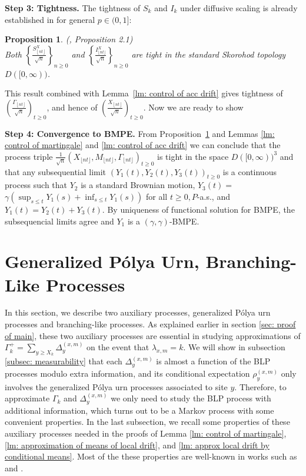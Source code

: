 \documentclass[twoside,12pt,a4paper]{article}
\newtheorem{proposition}{Proposition}[section]
\numberwithin{equation}{section}
\begin{document}
	
	\textbf{Step 3: Tightness.} The tightness of $S_k$ and $I_k$ under diffusive scaling is already established in \cite{KMP22} for general $p \in (0,1]$:
	\begin{proposition}
		(\cite{KMP22}, Proposition 2.1)\\
		\label{prop: tightness}
		Both $\left\{\frac{S_{\left\lfloor n t \right\rfloor}^X}{\sqrt{n}}\right\}_{n \geq 0}$ and $\left\{\frac{I_{\lfloor n t \rfloor}^X}{\sqrt{n}}\right\}_{n \geq 0}$ are tight in the standard Skorohod topology $D([0, \infty))$.
	\end{proposition}
	This result combined with Lemma~\ref{lm: control of acc drift} gives tightness of $\left(\frac{\Gamma_{\left\lfloor nt  \right\rfloor}}{\sqrt{n} }\right)_{t \ge 0}$, and hence of $\left(\frac{X_{\left\lfloor nt  \right\rfloor}}{\sqrt{n} }\right)_{t \ge 0}$. 
	Now we are ready to show
	\vspace{1em}
	
	\textbf{Step 4: Convergence to BMPE.} 
	From Proposition~\ref{prop: tightness} and Lemmas \ref{lm: control of martingale} and \ref{lm: control of acc drift} we can conclude that the process triple $\frac{1}{\sqrt{n}}\left(X_{\lfloor n t\rfloor}, M_{\lfloor n t\rfloor}, \Gamma_{\lfloor n t\rfloor}\right)_{t \geq 0}$ is tight in the space $D([0, \infty))^3$ and that any subsequential limit $\left(Y_1(t), Y_2(t), Y_3(t)\right)_{t \geq 0}$ is a continuous process such that $Y_2$ is a standard Brownian motion, $Y_3(t)=$ $\gamma\left(\sup _{s \leq t} Y_1(s)+\inf _{s \leq t} Y_1(s)\right)$ for all $t \geq 0, P$-a.s., and $Y_1(t)=Y_2(t)+Y_3(t)$. By uniqueness of functional solution for BMPE, the subsequencial limits agree and $Y_1$ is a $(\gamma, \gamma)$-BMPE.
	
	\section{Generalized P\'{o}lya Urn, Branching-Like Processes}\label{sec: generalized Polya Urn, BLP}
	
	In this section, we describe two auxiliary processes, generalized P\'{o}lya urn processes and branching-like processes. As explained earlier in section \ref{sec: proof of main}, these two auxiliary processes are essential in studying approximations of $\Gamma_k^+= \sum_{y\geq X_k} \Delta_{y}^{(x,m)}$ on the event that $\lambda_{x,m} = k$. We will show in subsection \ref{subsec: measurability} that each $\Delta^{(x,m)}_{y}$ is almost a function of the BLP processes modulo extra information, and its conditional expectation $\rho^{(x,m)}_{y}$ only involves the generalized P\'{o}lya urn processes associated to site $y$. Therefore, to approximate $\Gamma_k$ and $\Delta_{y}^{(x,m)}$ we only need to study the BLP process with additional information, which turns out to be a Markov process with some convenient properties. In the last subsection, we recall some properties of these auxiliary processes needed in the proofs of Lemma \ref{lm: control of martingale}, \ref{lm: approximation of means of local drift}, and \ref{lm: approx local drift by conditional means}. Most of the these properties are well-known in works such as \cite{KP16} and \cite{KMP22}. 
	
\end{document}
